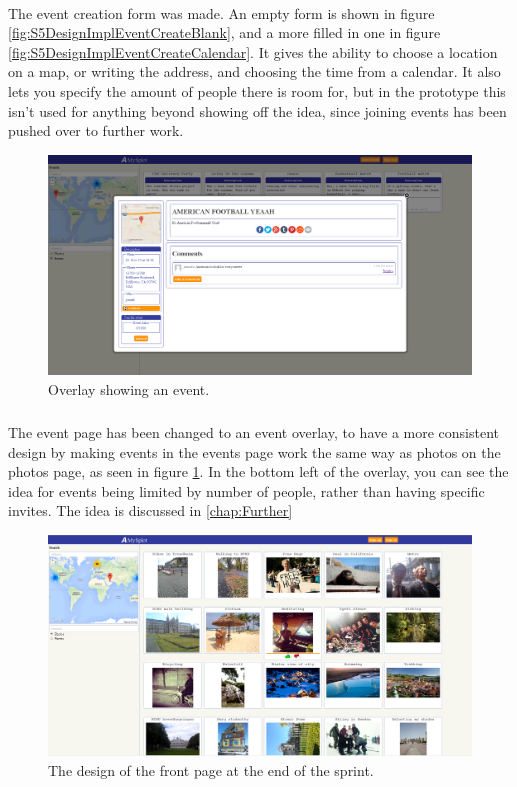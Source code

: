 \paragraph{} The event creation form was made. An empty form is shown in figure \ref{fig:S5DesignImplEventCreateBlank}, and a more filled in one in figure \ref{fig:S5DesignImplEventCreateCalendar}. It gives the ability to choose a location on a map, or writing the address, and choosing the time from a calendar. It also lets you specify the amount of people there is room for, but in the prototype this isn't used for anything beyond showing off the idea, since joining events has been pushed over to further work.

\begin{figure}[ht!]
  \centering
  \includegraphics[width=\linewidth]{./img/webpage/3Nov/EventsOverlay}
  \caption{Overlay showing an event.}
  \label{fig:S5DesignImplEventsOverlay}
\end{figure}

\subparagraph{} The event page has been changed to an event overlay, to have a more consistent design by making events in the events page work the same way as photos on the photos page, as seen in figure \ref{fig:S5DesignImplEventsOverlay}. In the bottom left of the overlay, you can see the idea for events being limited by number of people, rather than having specific invites. The idea is discussed in \ref{chap:Further}

\begin{figure}[ht!]
  \centering
  \includegraphics[width=\linewidth]{./img/webpage/3Nov/FrontpagePhotos}
  \caption{The design of the front page at the end of the sprint.}
  \label{fig:S5DesignImplFrontPhotos3Nov}
\end{figure}

